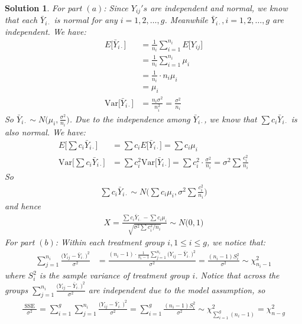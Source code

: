\documentclass[11pt]{article}
\newtheorem{sol}{Solution}
\begin{document}
\begin{sol}
	For part $(a)$:\vskip 2mm
	Since $Y_{ij}'s$ are independent and normal, we know that each $\bar{Y}_{i\cdot}$ is normal for any $i = 1, 2, \ldots, g$. Meanwhile $\bar{Y}_{i\cdot}, i = 1, 2, \ldots, g$ are independent.\vskip 2mm
	We have:
	\begin{align*}
		E\Big[\bar{Y}_{i\cdot}\Big] &= \frac{1}{n_i} \sum_{i = 1}^{n_i}E\Big[Y_{ij}\Big]\\
							&= \frac{1}{n_i}\sum_{i = 1}^{n_i}\mu_i\\
							&= \frac{1}{n_i}\cdot n_i \mu_i\\
							&= \mu_i\\
							\text{Var}\Big[\bar{Y}_{i\cdot}\Big] &= \frac{n_i \sigma^2}{n_i^2} = \frac{\sigma^2}{n_i}
	\end{align*}
	So $\bar{Y}_{i\cdot} \sim N\Big(\mu_i, \frac{\sigma^2}{n_i}\Big)$.\vskip 2mm
	Due to the independence among $\bar{Y}_{i\cdot}$, we know that $\sum c_i\bar{Y}_{i\cdot}$ is also normal. We have:
	\begin{align*}
		E\Big[\sum c_i\bar{Y}_{i\cdot}\Big] &= \sum c_i E\Big[\bar{Y}_{i\cdot}\Big] = \sum c_i\mu_i\\
		\text{Var}\Big[\sum c_i \bar{Y}_{i\cdot}\Big] &= \sum c^2_{i}\text{Var}\Big[\bar{Y}_{i\cdot}\Big] = \sum c^2_i\cdot \frac{\sigma^2}{n_i} =\sigma^2 \sum \frac{c^2_i}{n_i}
	\end{align*}
	So
	\begin{align*}
		\sum c_i\bar{Y}_{i\cdot }\sim N\Big(\sum c_i\mu_i, \sigma^2 \sum \frac{c^2_i}{n_i}\Big)
	\end{align*}
	and hence
	\begin{align*}
		X = \frac{\sum c_i\bar{Y}_{i\cdot} - \sum c_i\mu_i}{\sqrt{\sigma^2\sum c^2_i/n_i}}\sim N\Big(0, 1\Big)
	\end{align*}
	For part $(b)$:\vskip 2mm
	Within each treatment group $i, 1 \leq i \leq g$, we notice that:
	\begin{align*}
		\sum_{j = 1}^{n_i}\frac{\Big(Y_{ij} - \bar{Y}_{i\cdot}\Big)^2}{\sigma^2} &= \frac{(n_i - 1)\cdot \frac{1}{n_i - 1}\sum_{j = 1}^{n_i}\Big(Y_{ij} - \bar{Y}_{i\cdot}\Big)^2}{\sigma^2} = \frac{(n_i - 1)S^2_i}{\sigma^2} \sim \chi^2_{n_i - 1}
	\end{align*}
	where $S^2_i$ is the sample variance of treatment group $i$.\vskip 2mm
	Notice that across the groups $\sum_{j = 1}^{n_i}\frac{\Big(Y_{ij} - \bar{Y}_{i\cdot}\Big)^2}{\sigma^2}$ are independent due to the model assumption, so 
	\begin{align*}
		\frac{\text{ SSE }}{\sigma^2} = \sum_{i = 1}^g\sum_{j = 1}^{n_i}\frac{\Big(Y_{ij} - \bar{Y}_{i\cdot}\Big)^2}{\sigma^2} = \sum_{i = 1}^{g}\frac{(n_i - 1)S^2_i}{\sigma^2} \sim \chi^2_{\sum_{i = 1}^g(n_i - 1)} = \chi^2_{n - g}
	\end{align*}
\end{sol}
\end{document}
